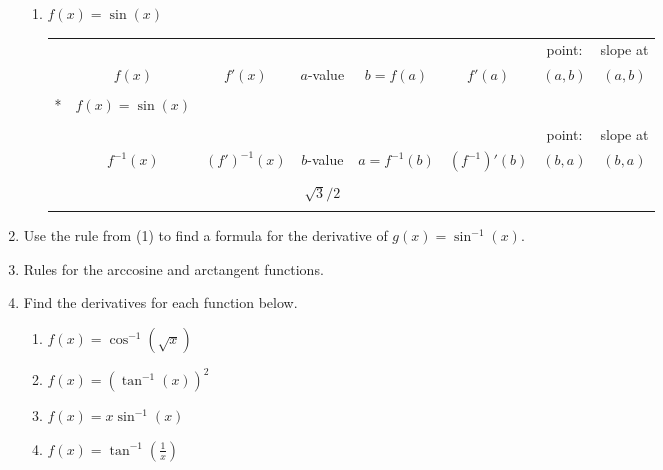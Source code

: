 \documentclass[11pt,fleqn]{article}
\begin{document}
\begin{enumerate}
\begin{enumerate}
%	

	
	\item $f(x)=\sin(x)$\\
	
\hspace*{-.5in}	\begin{tabular}{c|c|c|c|c|c|c|c}
&&&&&&point:&slope at\\
	&$f(x)$ & $f'(x)$ & $a$-value& $b=f(a)$ & $f'(a)$ & $(a,b)$&  $(a,b)$\\
	\hline
	&&&&&&\\
	*&$f(x)=\sin(x)$ &  & &  &  & & \\
	&&&&&&\\
	\hline
	\hline
	&&&&&&point:&slope at\\
	&$f^{-1}(x)$ &\quad\quad$(f')^{-1}(x)$ \quad\quad& $b$-value&\quad\quad $a=f^{-1}(b)$ \quad\quad& $(f^{-1})'(b)$ & \quad $(b,a)$&  $(b,a)$\\
	\hline&&&&&&\\ &&&$\sqrt{3}/2$&&&\\ &&&&&&\\
	\end{tabular}

	
	\end{enumerate}
\newpage
\item Use the rule from (1) to find a formula for the derivative of $g(x)=\sin^{-1}(x).$
\vspace{1.5in}
\item Rules for the arccosine and arctangent functions.\\
\vspace{1.5in}
\item Find the derivatives for each function below.
	\begin{enumerate}
	\item $f(x)=\cos^{-1}(\sqrt{x})$
	\vfill
	\item $f(x)=\left(\tan^{-1}(x)\right)^2$
	\vfill
	\item $f(x)=x\sin^{-1}(x)$
	\vfill
	\item $f(x)=\tan^{-1}(\frac{1}{x})$
	\vfill
	\end{enumerate}
\end{enumerate}
\end{document}
